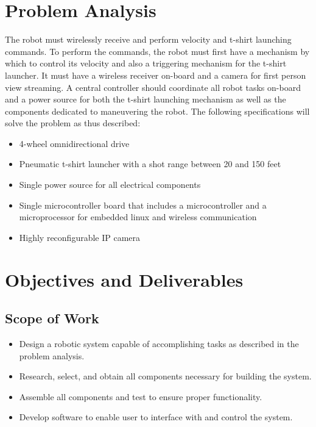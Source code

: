 \documentclass[letterpaper,12pt]{article}
\begin{document}
\section{Problem Analysis}
The robot must wirelessly receive and perform velocity and t-shirt launching commands. To perform the commands, the robot must first have a mechanism by which to control its velocity and also a triggering mechanism for the t-shirt launcher. It must have a wireless receiver on-board and a camera for first person view streaming. A central controller should coordinate all robot tasks on-board and a power source for both the t-shirt launching mechanism as well as the components dedicated to maneuvering the robot. The following specifications will solve the problem as thus described:
\begin{itemize}
\item 4-wheel omnidirectional drive
\item Pneumatic t-shirt launcher with a shot range between 20 and 150 feet
\item Single power source for all electrical components
\item Single microcontroller board that includes a microcontroller and a microprocessor for embedded linux and wireless communication
\item Highly reconfigurable IP camera
\end{itemize}

\section{Objectives and Deliverables}
\subsection{Scope of Work}
\begin{itemize}
\item Design a robotic system capable of accomplishing tasks as described in the problem analysis.
\item Research, select, and obtain all components necessary for building the system.
\item Assemble all components and test to ensure proper functionality.
\item Develop software to enable user to interface with and control the system.
\end{itemize}
\end{document}
